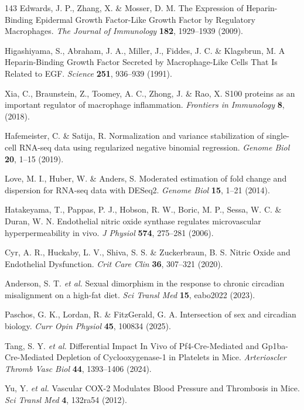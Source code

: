 \documentclass[12pt]{article}
\begin{document}
\begin{thebibliography}{143}
 Edwards, J. P., Zhang, X. \& Mosser, D. M. The Expression of Heparin-Binding Epidermal Growth Factor-Like Growth Factor by Regulatory Macrophages. \textit{The Journal of Immunology} \textbf{182}, 1929--1939 (2009).

 Higashiyama, S., Abraham, J. A., Miller, J., Fiddes, J. C. \& Klagsbrun, M. A Heparin-Binding Growth Factor Secreted by Macrophage-Like Cells That Is Related to EGF. \textit{Science} \textbf{251}, 936--939 (1991).

 Xia, C., Braunstein, Z., Toomey, A. C., Zhong, J. \& Rao, X. S100 proteins as an important regulator of macrophage inflammation. \textit{Frontiers in Immunology} \textbf{8}, (2018).

 Hafemeister, C. \& Satija, R. Normalization and variance stabilization of single-cell RNA-seq data using regularized negative binomial regression. \textit{Genome Biol} \textbf{20}, 1--15 (2019).

 Love, M. I., Huber, W. \& Anders, S. Moderated estimation of fold change and dispersion for RNA-seq data with DESeq2. \textit{Genome Biol} \textbf{15}, 1--21 (2014).

 Hatakeyama, T., Pappas, P. J., Hobson, R. W., Boric, M. P., Sessa, W. C. \& Duran, W. N. Endothelial nitric oxide synthase regulates microvascular hyperpermeability in vivo. \textit{J Physiol} \textbf{574}, 275--281 (2006).

 Cyr, A. R., Huckaby, L. V., Shiva, S. S. \& Zuckerbraun, B. S. Nitric Oxide and Endothelial Dysfunction. \textit{Crit Care Clin} \textbf{36}, 307--321 (2020).

 Anderson, S. T. \textit{et al.} Sexual dimorphism in the response to chronic circadian misalignment on a high-fat diet. \textit{Sci Transl Med} \textbf{15}, eabo2022 (2023).

 Paschos, G. K., Lordan, R. \& FitzGerald, G. A. Intersection of sex and circadian biology. \textit{Curr Opin Physiol} \textbf{45}, 100834 (2025).

 Tang, S. Y. \textit{et al.} Differential Impact In Vivo of Pf4-Cre-Mediated and Gp1ba-Cre-Mediated Depletion of Cyclooxygenase-1 in Platelets in Mice. \textit{Arterioscler Thromb Vasc Biol} \textbf{44}, 1393--1406 (2024).

 Yu, Y. \textit{et al.} Vascular COX-2 Modulates Blood Pressure and Thrombosis in Mice. \textit{Sci Transl Med} \textbf{4}, 132ra54 (2012).


\end{thebibliography}
\end{document}
